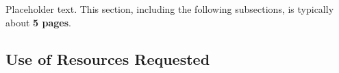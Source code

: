 \documentclass[11pt,letterpaper,english]{article}
\begin{document}
Placeholder text. This section, including the following subsections, is typically about \textbf{5 pages}.

\vspace{-.25in}
\subsection{Use of Resources Requested}
\vspace{-.2in}

\end{document}

